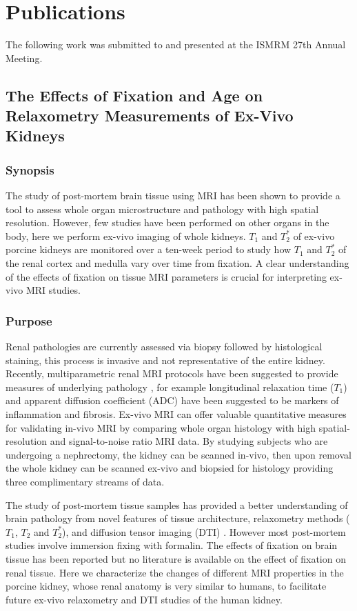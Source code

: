 \chapter{Publications}

The following work was submitted to and presented at the \ac{ISMRM} 27th Annual Meeting.

\section*{The Effects of Fixation and Age on Relaxometry Measurements of Ex-Vivo Kidneys}
\label{sec:ISMRM_Neph}
\subsection*{Synopsis}
The study of post-mortem brain tissue using MRI has been shown to provide a tool to assess whole organ microstructure and pathology with high spatial resolution. However, few studies have been performed on other organs in the body, here we perform ex-vivo imaging of whole kidneys. $T_1$ and $T_2^*$ of ex-vivo porcine kidneys are monitored over a ten-week period to study how $T_1$ and $T_2^*$ of the renal cortex and medulla vary over time from fixation. A clear understanding of the effects of fixation on tissue MRI parameters is crucial for interpreting ex-vivo MRI studies.

\subsection*{Purpose}

Renal pathologies are currently assessed via biopsy followed by histological staining, this process is invasive and not representative of the entire kidney. Recently, multiparametric renal MRI protocols \cite{cox_multiparametric_2017} have been suggested to provide measures of underlying pathology \cite{friedli_new_2016}, for example longitudinal relaxation time ($T_1$) and apparent diffusion coefficient (ADC) have been suggested to be markers of inflammation and fibrosis. Ex-vivo MRI can offer valuable quantitative measures for validating in-vivo MRI by comparing whole organ histology with high spatial-resolution and signal-to-noise ratio MRI data. By studying subjects who are undergoing a nephrectomy, the kidney can be scanned in-vivo, then upon removal the whole kidney can be scanned ex-vivo and biopsied for histology providing three complimentary streams of data. 

The study of post-mortem tissue samples has provided a better understanding of brain pathology from novel features of  tissue architecture, relaxometry methods ($T_1$, $T_2$ and $T_2^*$), and diffusion tensor imaging (DTI) \cite{birkl_effects_2016, kolasinski_combined_2012, miller_diffusion_2011}. However most post-mortem studies involve immersion fixing with formalin. The effects of fixation on brain tissue has been reported \cite{tovi_measurements_1992, shatil_quantitative_2018} but no literature is available on the effect of fixation on renal tissue. Here we characterize the changes of different MRI properties in the porcine kidney, whose renal anatomy is very similar to humans, to facilitate future ex-vivo relaxometry and DTI studies of the human kidney.

